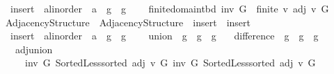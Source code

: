 \begin{isabellebody}
\ \ insert\ {\isacharcolon}{\kern0pt}{\isacharcolon}{\kern0pt}\ {\isachardoublequoteopen}{\isacharprime}{\kern0pt}a{\isacharcolon}{\kern0pt}{\isacharcolon}{\kern0pt}linorder\ {\isasymRightarrow}\ {\isacharprime}{\kern0pt}a\ {\isasymRightarrow}\ {\isacharprime}{\kern0pt}g\ {\isasymRightarrow}\ {\isacharprime}{\kern0pt}g{\isachardoublequoteclose}\ {\isacharplus}{\kern0pt}\isanewline
\ \ \ finite{\isacharunderscore}{\kern0pt}domain{\isacharunderscore}{\kern0pt}tbd{\isacharcolon}{\kern0pt}\ {\isachardoublequoteopen}inv\ G\ {\isasymLongrightarrow}\ finite\ {\isacharbraceleft}{\kern0pt}v{\isachardot}{\kern0pt}\ adj\ v\ G\ {\isasymnoteq}\ {\isacharbrackleft}{\kern0pt}{\isacharbrackright}{\kern0pt}{\isacharbraceright}{\kern0pt}{\isachardoublequoteclose}\isanewline
\isanewline
{}\isamarkupfalse%
\ Adjacency{\isacharunderscore}{\kern0pt}Structure{\isacharunderscore}{\kern0pt}{}\ {\isacharequal}{\kern0pt}\ Adjacency{\isacharunderscore}{\kern0pt}Structure\ \ insert\ {\isacharequal}{\kern0pt}\ insert\ \isanewline
\ \ insert\ {\isacharcolon}{\kern0pt}{\isacharcolon}{\kern0pt}\ {\isachardoublequoteopen}{\isacharprime}{\kern0pt}a{\isacharcolon}{\kern0pt}{\isacharcolon}{\kern0pt}linorder\ {\isasymRightarrow}\ {\isacharprime}{\kern0pt}a\ {\isasymRightarrow}\ {\isacharprime}{\kern0pt}g\ {\isasymRightarrow}\ {\isacharprime}{\kern0pt}g{\isachardoublequoteclose}\ {\isacharplus}{\kern0pt}\isanewline
\ \ \ union\ {\isacharcolon}{\kern0pt}{\isacharcolon}{\kern0pt}\ {\isachardoublequoteopen}{\isacharprime}{\kern0pt}g\ {\isasymRightarrow}\ {\isacharprime}{\kern0pt}g\ {\isasymRightarrow}\ {\isacharprime}{\kern0pt}g{\isachardoublequoteclose}\isanewline
\ \ \ difference\ {\isacharcolon}{\kern0pt}{\isacharcolon}{\kern0pt}\ {\isachardoublequoteopen}{\isacharprime}{\kern0pt}g\ {\isasymRightarrow}\ {\isacharprime}{\kern0pt}g\ {\isasymRightarrow}\ {\isacharprime}{\kern0pt}g{\isachardoublequoteclose}\isanewline
\ \ \ adj{\isacharunderscore}{\kern0pt}union{\isacharcolon}{\kern0pt}\isanewline
\ \ \ \ {\isachardoublequoteopen}{\isasymlbrakk}\ inv\ G{}{\isacharsemicolon}{\kern0pt}\ Sorted{\isacharunderscore}{\kern0pt}Less{\isachardot}{\kern0pt}sorted\ {\isacharparenleft}{\kern0pt}adj\ v\ G{}{\isacharparenright}{\kern0pt}{\isacharsemicolon}{\kern0pt}\ inv\ G{}{\isacharsemicolon}{\kern0pt}\ Sorted{\isacharunderscore}{\kern0pt}Less{\isachardot}{\kern0pt}sorted\ {\isacharparenleft}{\kern0pt}adj\ v\ G{}{\isacharparenright}{\kern0pt}\ {\isasymrbrakk}\ {\isasymLongrightarrow}\isanewline

\end{isabellebody}

